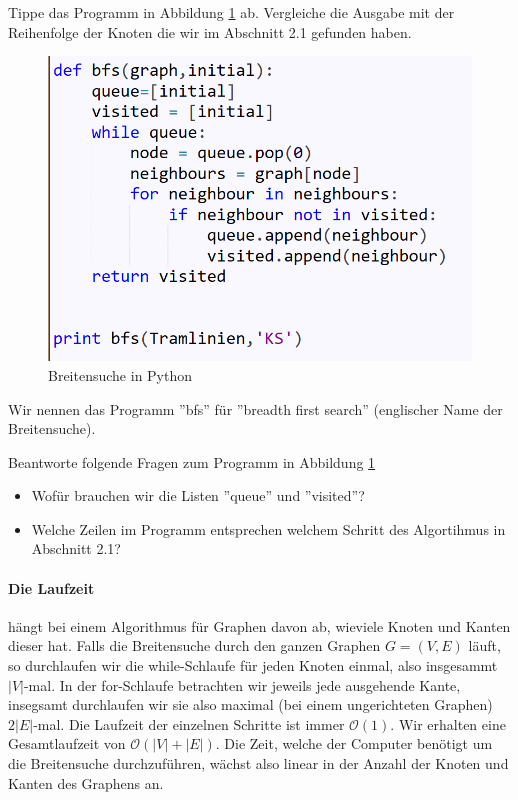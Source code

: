 Tippe das Programm in Abbildung \ref{fig:Breitensuche} ab. Vergleiche die Ausgabe mit der Reihenfolge der Knoten die wir im Abschnitt 2.1 gefunden haben.

\begin{figure}[H]
    \centering
    \includegraphics[scale=0.8]{Pictures/Breitensucheprog.PNG}
    \caption{Breitensuche in Python}
    \label{fig:Breitensuche}
\end{figure}

Wir nennen das Programm ''bfs'' für ''breadth first search'' (englischer Name der Breitensuche). 

\begin{aufgabe} \label{ProgFragen} Beantworte folgende Fragen zum Programm in Abbildung \ref{fig:Breitensuche}
\begin{itemize} 
    \item Wofür brauchen wir die Listen ''queue'' und ''visited''?
    \item Welche Zeilen im Programm entsprechen welchem Schritt des Algortihmus in Abschnitt 2.1?
\end{itemize}
\end{aufgabe}

\paragraph{Die Laufzeit} hängt bei einem Algorithmus für Graphen davon ab, wieviele Knoten und Kanten dieser hat. Falls die Breitensuche durch den ganzen Graphen $G=(V,E)$ läuft, so durchlaufen wir die while-Schlaufe für jeden Knoten einmal, also insgesammt $|V|$-mal. In der for-Schlaufe betrachten wir jeweils jede ausgehende Kante, insegsamt durchlaufen wir sie also maximal (bei einem ungerichteten Graphen) $2|E|$-mal. Die Laufzeit der einzelnen Schritte ist immer $\mathcal{O}(1)$. Wir erhalten eine Gesamtlaufzeit von $\mathcal{O}(|V|+|E|)$. Die Zeit, welche der Computer benötigt um die Breitensuche durchzuführen, wächst also linear in der Anzahl der Knoten und Kanten des Graphens an.

